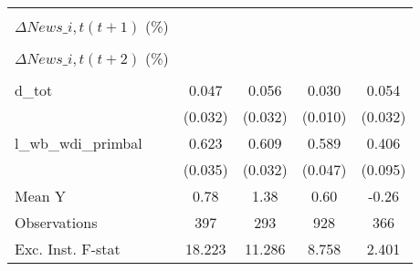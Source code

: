 {\begin{tabular}{l*{4}{c}}
                    &                     &                     &                     &                     \\
\addlinespace
$ \Delta News\_{i,t}(t+1)$ (\%)&                     &                     &                     &                     \\
                    &                     &                     &                     &                     \\
\addlinespace
$ \Delta News\_{i,t}(t+2)$ (\%)&                     &                     &                     &                     \\
                    &                     &                     &                     &                     \\
\addlinespace
d\_tot               &       0.047         &       0.056\sym{*}  &       0.030\sym{***}&       0.054\sym{*}  \\
                    &     (0.032)         &     (0.032)         &     (0.010)         &     (0.032)         \\
\addlinespace
l\_wb\_wdi\_primbal    &       0.623\sym{***}&       0.609\sym{***}&       0.589\sym{***}&       0.406\sym{***}\\
                    &     (0.035)         &     (0.032)         &     (0.047)         &     (0.095)         \\
\midrule
Mean Y              &        0.78         &        1.38         &        0.60         &       -0.26         \\
Observations        &         397         &         293         &         928         &         366         \\
Exc. Inst. F-stat   &      18.223         &      11.286         &       8.758         &       2.401         \\
\bottomrule
\end{tabular}
}

